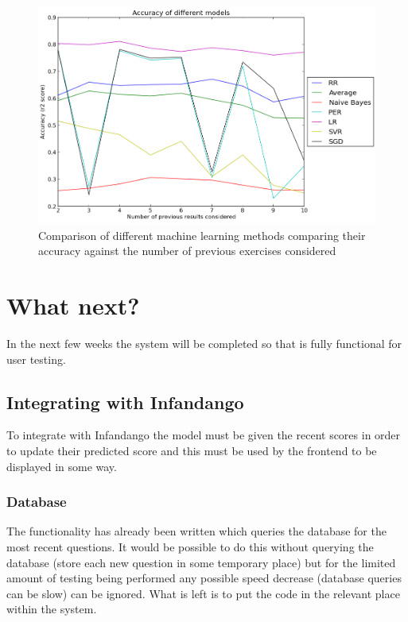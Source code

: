 \begin{figure}[p]
\centering
\includegraphics[width=1\textwidth]{comparison.png}
\caption{Comparison of different machine learning methods comparing their accuracy against the number of previous exercises considered}
\label{fig:comparison}
\end{figure}


\section{What next?}
In the next few weeks the system will be completed so that is fully functional for user testing.

\subsection{Integrating with Infandango}
To integrate with Infandango the model must be given the recent scores in order to update their predicted score and this must be used by the frontend to be displayed in some way.

\subsubsection{Database}
The functionality has already been written which queries the database for the most recent questions. It would be possible to do this without querying the database (store each new question in some temporary place) but for the limited amount of testing being performed any possible speed decrease (database queries can be slow) can be ignored. What is left is to put the code in the relevant place within the system.

